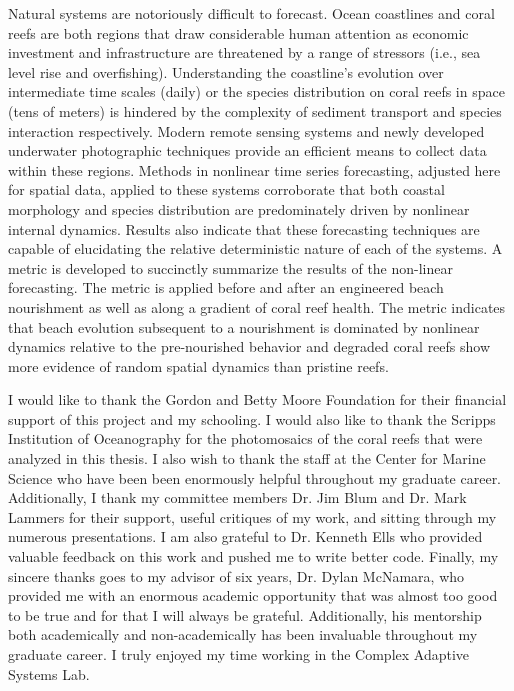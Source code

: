\documentclass[12 pt]{uncw_thesis}
\begin{document}
Natural systems are notoriously difficult to forecast.  Ocean coastlines and coral reefs are both regions that draw considerable human attention as economic investment and infrastructure are threatened by a range of stressors (i.e., sea level rise and overfishing). Understanding the coastline's evolution over intermediate time scales (daily) or the species distribution on coral reefs in space (tens of meters) is hindered by the complexity of sediment transport and species interaction respectively. Modern remote sensing systems and newly developed underwater photographic techniques provide an efficient means to collect data within these regions. Methods in nonlinear time series forecasting, adjusted here for spatial data, applied to these systems corroborate that both coastal morphology and species distribution are predominately driven by nonlinear internal dynamics. Results also indicate that these forecasting techniques are capable of elucidating the relative deterministic nature of each of the systems. A metric is developed to succinctly summarize the results of the non-linear forecasting. The metric is applied before and after an engineered beach nourishment as well as along a gradient of coral reef health. The metric indicates that beach evolution subsequent to a nourishment is dominated by nonlinear dynamics relative to the pre-nourished behavior and degraded coral reefs show more evidence of random spatial dynamics than pristine reefs.
%
%
%
%
\newpage
{}
I would like to thank the Gordon and Betty Moore Foundation for their financial support of this project
and my schooling. I would also like to thank the Scripps Institution of Oceanography for the photomosaics of the coral reefs that were analyzed in this thesis. I also wish to thank the staff at the Center for Marine Science who have been been enormously helpful throughout my graduate career. Additionally, I thank my committee members Dr. Jim Blum and Dr. Mark Lammers for their support, useful critiques of my work, and sitting through my numerous presentations. I am also grateful to Dr. Kenneth Ells who provided valuable feedback on this work and pushed me to write better code. Finally, my sincere thanks goes to my advisor of six years, Dr. Dylan McNamara, who provided me with an enormous academic opportunity that was almost too good to be true and for that I will always be grateful. Additionally, his mentorship both academically and non-academically has been invaluable throughout my graduate career. I truly enjoyed my time working in the Complex Adaptive Systems Lab.
\end{document}
